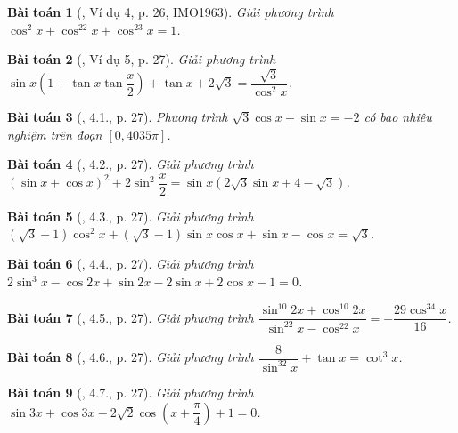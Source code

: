 \documentclass{article}
\newtheorem{baitoan}{Bài toán}
\begin{document}
\begin{baitoan}[\cite{Hung_nang_cao_phat_trien_Toan_11_tap_1}, Ví dụ 4, p. 26, IMO1963]
	Giải phương trình $\cos^2x + \cos^22x + \cos^23x = 1$.
\end{baitoan}

\begin{baitoan}[\cite{Hung_nang_cao_phat_trien_Toan_11_tap_1}, Ví dụ 5, p. 27]
	Giải phương trình $\sin x\left(1 + \tan x\tan\dfrac{x}{2}\right) + \tan x + 2\sqrt{3} = \dfrac{\sqrt{3}}{\cos^2x}$.
\end{baitoan}

\begin{baitoan}[\cite{Hung_nang_cao_phat_trien_Toan_11_tap_1}, 4.1., p. 27]
	Phương trình $\sqrt{3}\cos x + \sin x = -2$ có bao nhiêu nghiệm trên đoạn $[0,4035\pi]$.
\end{baitoan}

\begin{baitoan}[\cite{Hung_nang_cao_phat_trien_Toan_11_tap_1}, 4.2., p. 27]
	Giải phương trình $(\sin x + \cos x)^2 + 2\sin^2\dfrac{x}{2} = \sin x(2\sqrt{3}\sin x + 4 - \sqrt{3})$.
\end{baitoan}

\begin{baitoan}[\cite{Hung_nang_cao_phat_trien_Toan_11_tap_1}, 4.3., p. 27]
	Giải phương trình $(\sqrt{3} + 1)\cos^2x + (\sqrt{3} - 1)\sin x\cos x + \sin x - \cos x = \sqrt{3}$.
\end{baitoan}

\begin{baitoan}[\cite{Hung_nang_cao_phat_trien_Toan_11_tap_1}, 4.4., p. 27]
	Giải phương trình $2\sin^3x - \cos2x + \sin2x - 2\sin x + 2\cos x - 1 = 0$.
\end{baitoan}

\begin{baitoan}[\cite{Hung_nang_cao_phat_trien_Toan_11_tap_1}, 4.5., p. 27]
	Giải phương trình $\dfrac{\sin^{10}2x + \cos^{10}2x}{\sin^22x - \cos^22x} = -\dfrac{29\cos^34x}{16}$.
\end{baitoan}

\begin{baitoan}[\cite{Hung_nang_cao_phat_trien_Toan_11_tap_1}, 4.6., p. 27]
	Giải phương trình $\dfrac{8}{\sin^32x} + \tan x = \cot^3x$.
\end{baitoan}

\begin{baitoan}[\cite{Hung_nang_cao_phat_trien_Toan_11_tap_1}, 4.7., p. 27]
	Giải phương trình $\sin3x + \cos3x - 2\sqrt{2}\cos\left(x + \dfrac{\pi}{4}\right) + 1 = 0$.
\end{baitoan}
\end{document}
